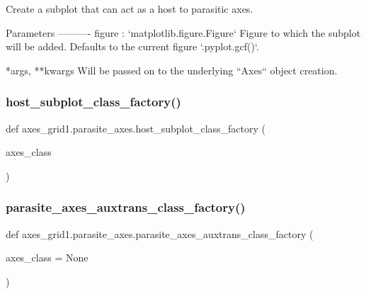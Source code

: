 \begin{DoxyVerb}Create a subplot that can act as a host to parasitic axes.

Parameters
----------
figure : `matplotlib.figure.Figure`
    Figure to which the subplot will be added. Defaults to the current
    figure `.pyplot.gcf()`.

*args, **kwargs
    Will be passed on to the underlying ``Axes`` object creation.
\end{DoxyVerb}
 \mbox{\label{namespaceaxes__grid1_1_1parasite__axes_a622dfda270b0f0222f82112fdbeacd9c}} 
\subsubsection{\texorpdfstring{host\+\_\+subplot\+\_\+class\+\_\+factory()}{host\_subplot\_class\_factory()}}
{\footnotesize\ttfamily def axes\+\_\+grid1.\+parasite\+\_\+axes.\+host\+\_\+subplot\+\_\+class\+\_\+factory (\begin{DoxyParamCaption}\item[{}]{axes\+\_\+class }\end{DoxyParamCaption})}

\mbox{\label{namespaceaxes__grid1_1_1parasite__axes_ab531ed3a5ef2bbcfeecdd1a3be82482c}} 
\subsubsection{\texorpdfstring{parasite\+\_\+axes\+\_\+auxtrans\+\_\+class\+\_\+factory()}{parasite\_axes\_auxtrans\_class\_factory()}}
{\footnotesize\ttfamily def axes\+\_\+grid1.\+parasite\+\_\+axes.\+parasite\+\_\+axes\+\_\+auxtrans\+\_\+class\+\_\+factory (\begin{DoxyParamCaption}\item[{}]{axes\+\_\+class = {\ttfamily None} }\end{DoxyParamCaption})}

